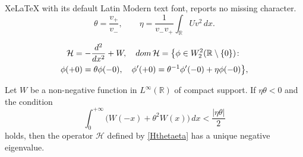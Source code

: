 \documentclass[10pt,a4paper]{amsart}
\newcommand{\Real}{\mathbb R}
\newcommand{\cH}{\mathcal{H}}
\newcommand{\dmn}{\mathop{\rm dom}}
\begin{document}
XeLaTeX with its default Latin Modern text font, reports no missing character.
\begin{equation}\label{ThetaEta}
 \theta = \frac{v_+}{v_-}, \qquad \eta=\frac1{v_-v_+}\int_{\Real} Uv^2\,dx.
\end{equation}

\begin{multline}\label{Hthetaeta}
  \cH=-\frac{d^2}{dx^2}+W, \quad \dmn \cH=\big\{\phi\in W^2_2(\Real\setminus\{0\})\colon \\
  \phi(+0)=\theta\phi(-0), \quad\phi'(+0)=\theta^{-1}\phi'(-0)+\eta \phi(-0)\big\},
\end{multline}

\begin{lem}
Let $W$ be a non-negative function in $L^\infty(\Real)$ of compact support.
If $\eta\theta<0$ and the condition
\begin{equation}\label{CondWThetaW}
   \int_0^{+\infty}\big(W(-x)+\theta^2 W(x)\big)\,dx<\frac{|\eta\theta|}{2}
\end{equation}
holds, then the operator $\cH$ defined by \eqref{Hthetaeta} has a unique negative eigenvalue.
\end{lem}
\end{document}
